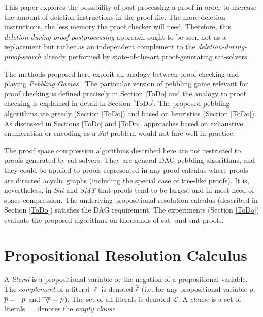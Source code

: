 \documentclass{llncs}
\begin{document}
This paper explores the possibility of post-processing a proof in order to increase the amount of deletion instructions in the proof file. The more deletion instructions, the less memory the proof checker will need. Therefore, this \emph{deletion-during-proof-postprocessing} approach ought to be seen not as a replacement but rather as an independent complement to the \emph{deletion-during-proof-search} already performed by state-of-the-art proof-generating sat-solvers.

The methods proposed here exploit an analogy between proof checking and 
playing \emph{Pebbling Games} \cite{kasai1979classes,gilbert1980pebbling}. 
The particular version of pebbling game relevant for proof checking is defined precisely in Section \ref{ToDo} and the analogy to proof checking is explained in detail in Section \ref{ToDo}. The proposed pebbling algorithms are greedy (Section \ref{ToDo}) and based on heuristics (Section \ref{ToDo}). As discussed in Sections \ref{ToDo} and \ref{ToDo}, approaches based on exhaustive enumeration or encoding as a \emph{Sat} problem would not fare well in practice.

The proof space compression algorithms described here are not restricted to proofs generated by sat-solvers. They are general DAG pebbling algorithms, and they could be applied to proofs represented in any proof calculus where proofs are directed acyclic graphs (including the special case of tree-like proofs). It is, nevertheless, in \emph{Sat} and \emph{SMT} that proofs tend to be largest and in most need of space compression. The underlying propositional resolution calculus (described in Section \ref{ToDo}) satisfies the DAG requirement. The experiments (Section \ref{ToDo}) evaluate the proposed algorithms on thousands of sat- and smt-proofs.


\section{Propositional Resolution Calculus}

A \emph{literal} is a propositional variable or the negation of a propositional variable. The
\emph{complement} of a literal $\ell$ is denoted $\overline{\ell}$ (i.e. for any propositional variable $p$,
$\overline{p} = \neg p$ and $\overline{\neg p} = p$). The set of all literals is denoted $\mathcal{L}$. A
\emph{clause} is a set of literals. $\bot$ denotes the \emph{empty clause}.


\newcommand{\axiom}[1]{\widehat{#1}}
\newcommand{\n}{v}
\newcommand{\raiz}[1]{\rho(#1)}
\end{document}
